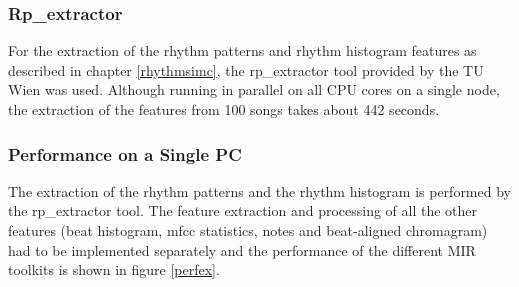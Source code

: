 \subsubsection{Rp\_extractor}

For the extraction of the rhythm patterns and rhythm histogram features as described in chapter \ref{rhythmsimc}, the rp\_extractor tool provided by the TU Wien was used. Although running in parallel on all CPU cores on a single node, the extraction of the features from 100 songs takes about 442 seconds.

\subsubsection{Performance on a Single PC}

The extraction of the rhythm patterns and the rhythm histogram is performed by the rp\_extractor tool. The feature extraction and processing of all the other features (beat histogram, mfcc statistics, notes and beat-aligned chromagram) had to be implemented separately and the performance of the different MIR toolkits is shown in figure \ref{perfex}. 

